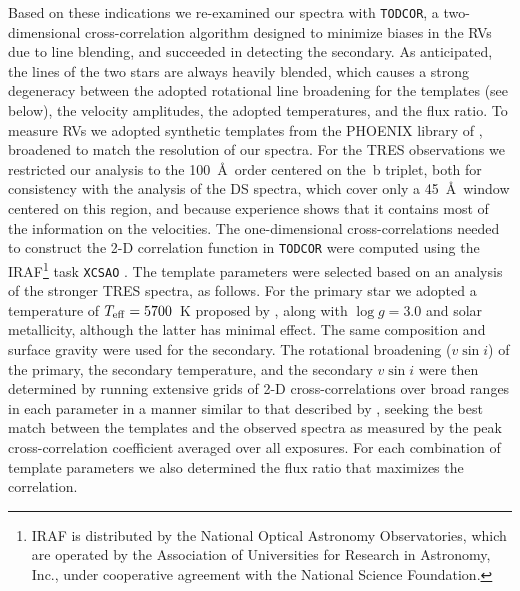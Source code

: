\documentclass[twocolumn]{aastex61}
\begin{document}
Based on these indications we re-examined our spectra with {\tt TODCOR}, a two-dimensional cross-correlation algorithm designed to minimize biases in the RVs due to line blending, and succeeded in detecting the secondary. As anticipated, the lines of the two stars are always heavily blended, which causes a strong degeneracy between the adopted rotational line broadening for the templates (see below), the velocity amplitudes, the adopted temperatures, and the flux ratio. To measure RVs we adopted synthetic templates from the PHOENIX library of \cite{husser13}, broadened to match the resolution of our spectra. For the TRES observations we restricted our analysis to the 100~\AA\ order centered on the \,b triplet, both for consistency with the analysis of the DS spectra, which cover only a 45~\AA\ window centered on this region, and because experience shows that it contains most of the information on the velocities. The one-dimensional cross-correlations needed to construct the 2-D correlation function in {\tt TODCOR} were computed using the IRAF\footnote{IRAF is distributed by the National Optical Astronomy Observatories, which are operated by the Association of Universities for Research in Astronomy, Inc., under cooperative agreement with the National Science Foundation.} task {\tt XCSAO} \citep{kurtz98}. The template parameters were selected based on an analysis of the stronger TRES spectra, as follows. For the primary star we adopted a temperature of $T_{\rm eff} = 5700$~K proposed by \cite{mathieu91}, along with $\log g = 3.0$ and solar metallicity, although the latter has minimal effect. The same composition and surface gravity were used for the secondary. The rotational broadening ($v \sin i$) of the primary, the secondary temperature, and the secondary $v \sin i$ were then determined by running extensive grids of 2-D cross-correlations over broad ranges in each parameter in a manner similar to that described by \cite{torres02}, seeking the best match between the templates and the observed spectra as measured by the peak cross-correlation coefficient averaged over all exposures. For each combination of template parameters we also determined the flux ratio that maximizes the correlation.
\end{document}
